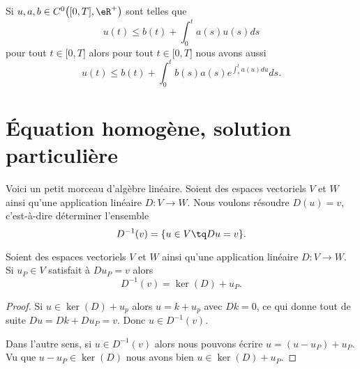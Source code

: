 \begin{lemma}        \label{LEMooUGZGooCczAmKa}
	Si \( u,a,b\in C^0\big( \mathopen[ 0 , T \mathclose],\eR^+ \big)\) sont telles que
	\begin{equation}
		u(t)\leq b(t)+\int_0^ta(s)u(s)ds
	\end{equation}
	pour tout \( t\in \mathopen[ 0 , T \mathclose]\) alors pour tout \( t\in \mathopen[ 0 , T \mathclose]\) nous avons aussi
	\begin{equation}
		u(t)\leq b(t)+\int_0^tb(s)a(s) e^{\int_s^ta(u)du}ds.
	\end{equation}
\end{lemma}

\section{Équation homogène, solution particulière}

Voici un petit morceau d'algèbre linéaire. Soient des espaces vectoriels \( V\) et \(W\) ainsi qu'une application linéaire \( D\colon V\to W\). Nous voulons résoudre \( D(u)=v\), c'est-à-dire déterminer l'ensemble
\begin{equation}
	D^{-1}(v)=\{ u\in V\tq Du=v \}.
\end{equation}

\begin{lemma}       \label{LEMooEWUPooXNJMcc}
	Soient des espaces vectoriels \( V\) et \(W\) ainsi qu'une application linéaire \( D\colon V\to W\). Si \( u_P\in V\) satisfait à \( Du_P=v\) alors
	\begin{equation}
		D^{-1}(v)=\ker(D)+u_P.
	\end{equation}
\end{lemma}

\begin{proof}
	Si \( u\in \ker(D)+u_p\) alors \( u=k+u_p\) avec \( Dk=0\), ce qui donne tout de suite \( Du=Dk+Du_P=v\). Donc \( u\in D^{-1}(v)\).

	Dans l'autre sens, si \( u\in D^{-1}(v)\) alors nous pouvons écrire \( u=(u-u_P)+u_P\). Vu que \( u-u_P\in\ker(D)\) nous avons bien \( u\in\ker(D)+u_P\).
\end{proof}


